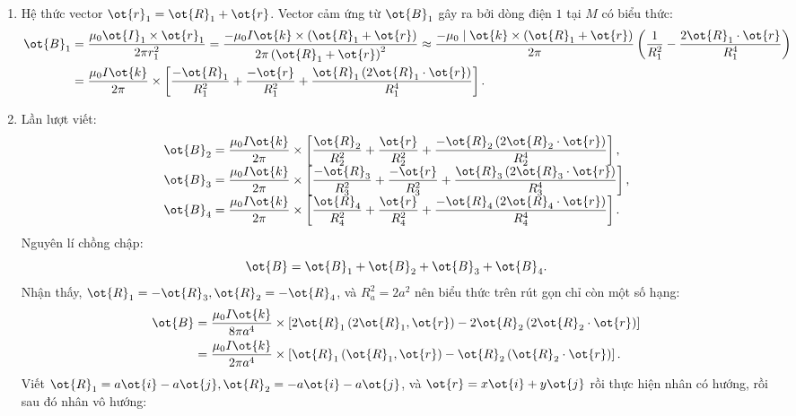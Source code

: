 \begin{loigiai}
\begin{enumerate}[1)]
    \item  Hệ thức vector $\ot{r}_{1}=\ot{R}_{1}+\ot{r}$. Vector cảm ứng từ $\ot{B}_{1}$ gây ra bởi dòng điện $1$ tại ${M}$ có biểu thức:
\[
\begin{aligned}
\ot{B}_{1} &=\dfrac{\mu_{0} \ot{I}_{1} \times \ot{r}_{1}}{2 \pi r_{1}^{2}}=\dfrac{-\mu_{0} I \ot{k} \times\left(\ot{R}_{1}+\ot{r}\right)}{2 \pi\left(\ot{R}_{1}+\ot{r}\right)^{2}} \approx \dfrac{-\mu_{0} \mid \ot{k} \times\left(\ot{R}_{1}+\ot{r}\right)}{2 \pi}\left(\dfrac{1}{R_{1}^{2}}-\dfrac{2 \ot{R}_{1} \cdot \ot{r}}{R_{1}^{4}}\right) \\
&=\dfrac{\mu_{0} I \ot{k}}{2 \pi} \times\left[\dfrac{-\ot{R}_{1}}{R_{1}^{2}}+\dfrac{-\ot{r}}{R_{1}^{2}}+\dfrac{\ot{R}_{1}\left(2 \ot{R}_{1} \cdot \ot{r}\right)}{R_{1}^{4}}\right].
\end{aligned}
\]
\item  Lần lượt viết:
\[
\begin{array}{l}
\ot{B}_{2}=\dfrac{\mu_{0} I \ot{k}}{2 \pi} \times\left[\dfrac{\ot{R}_{2}}{R_{2}^{2}}+\dfrac{\ot{r}}{R_{2}^{2}}+\dfrac{-\ot{R}_{2}\left(2 \ot{R}_{2} \cdot \ot{r}\right)}{R_{2}^{4}}\right], \\
\ot{B}_{3}=\dfrac{\mu_{0} I \ot{k}}{2 \pi} \times\left[\dfrac{-\ot{R}_{3}}{R_{3}^{2}}+\dfrac{-\ot{r}}{R_{3}^{2}}+\dfrac{\ot{R}_{3}\left(2 \ot{R}_{3} \cdot \ot{r}\right)}{R_{3}^{4}}\right], \\
\ot{B}_{4}=\dfrac{\mu_{0} I \ot{k}}{2 \pi} \times\left[\dfrac{\ot{R}_{4}}{R_{4}^{2}}+\dfrac{\ot{r}}{R_{4}^{2}}+\dfrac{-\ot{R}_{4}\left(2 \ot{R}_{4} \cdot \ot{r}\right)}{R_{4}^{4}}\right].
\end{array}
\]
Nguyên lí chồng chập:
\[
\ot{B}=\ot{B}_{1}+\ot{B}_{2}+\ot{B}_{3}+\ot{B}_{4}.
\]
Nhận thấy, $\ot{R}_{1}=-\ot{R}_{3}, \ot{R}_{2}=-\ot{R}_{4}$, và $R_{a}^{2}=2 a^{2}$ nên biểu thức trên rút gọn chỉ còn một số hạng:
\begin{align*}
\ot{B}&=\dfrac{\mu_{0} I \ot{k}}{8 \pi a^{4}} \times\left[2 \ot{R}_{1}\left(2 \ot{R}_{1}, \ot{r}\right)-2 \ot{R}_{2}\left(2 \ot{R}_{2} \cdot \ot{r}\right)\right]\\
&=\dfrac{\mu_{0} I \ot{k}}{2 \pi a^{4}} \times\left[\ot{R}_{1}\left(\ot{R}_{1}, \ot{r}\right)-\ot{R}_{2}\left(\ot{R}_{2} \cdot \ot{r}\right)\right].
\end{align*}
Viết $\ot{R}_{1}=a \ot{i}-a \ot{j}, \ot{R}_{2}=-a \ot{i}-a \ot{j}$, và $\ot{r}=x \ot{i}+y \ot{j}$ rồi thực hiện nhân có hướng, rồi sau đó nhân vô hướng:

\end{enumerate}
\end{loigiai}
